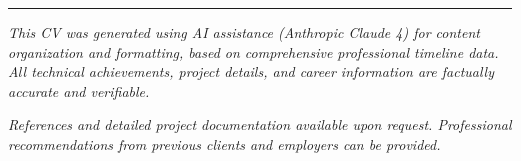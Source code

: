 \documentclass[10pt,a4paper]{article}
\begin{document}
\vspace{5mm}

\hrule

\vspace{2mm}

\footnotesize
\textit{This CV was generated using AI assistance (Anthropic Claude 4) for content organization and formatting, based on comprehensive professional timeline data. All technical achievements, project details, and career information are factually accurate and verifiable.}

\textit{References and detailed project documentation available upon request. Professional recommendations from previous clients and employers can be provided.}
\end{document}
